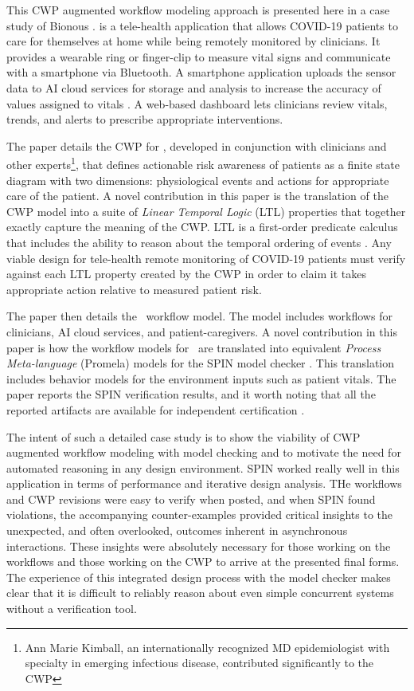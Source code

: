 This CWP augmented workflow modeling approach is presented here in a case study of Bionous \phware. \phware is a tele-health application that allows COVID-19 patients to care for themselves at home while being remotely monitored by clinicians. It provides a wearable ring or finger-clip to measure vital signs and communicate with a smartphone via Bluetooth. A smartphone application uploads the sensor data to AI cloud services for storage and analysis to increase the accuracy of values assigned to vitals \cite{Altschul2004PredictiveMI,10.2307/2984877,10.5555/1643031.1643047}. A web-based dashboard lets clinicians review vitals, trends, and alerts to prescribe appropriate interventions. 

The paper details the CWP for \phware, developed in conjunction with clinicians and other experts\footnote{Ann Marie Kimball, an internationally recognized  MD epidemiologist with specialty in emerging infectious disease, contributed significantly to the CWP}, that defines actionable risk awareness of patients as a finite state diagram with two dimensions: physiological events and actions for appropriate care of the patient. A novel contribution in this paper is the translation of the CWP model into a suite of \emph{Linear Temporal Logic} (LTL) properties that together exactly capture the meaning of the CWP. LTL is a first-order predicate calculus that includes the ability to reason about the temporal ordering of events \cite{10.5555/975331}. Any viable design for tele-health remote monitoring of COVID-19 patients must verify against each LTL property created by the CWP in order to claim it takes appropriate action relative to measured patient risk.

The paper then details the \phware\ workflow model. The model includes workflows for clinicians, AI cloud services, and patient-caregivers. A novel contribution in this paper is how the workflow models for \phware\ are translated into equivalent \emph{Process Meta-language} (Promela) models for the SPIN model checker \cite{spin}. This translation includes behavior models for the environment inputs such as patient vitals. The paper reports the SPIN verification results, and it worth noting that all the reported artifacts are available for independent certification \cite{repo}.

The intent of such a detailed case study is to show the viability of CWP augmented workflow modeling with model checking and to motivate the need for automated reasoning in any design environment. SPIN worked really well in this application in terms of performance and iterative design analysis. THe workflows and CWP revisions were easy to verify when posted, and when SPIN found violations, the accompanying counter-examples provided critical insights to the unexpected, and often overlooked, outcomes inherent in asynchronous interactions. These insights were absolutely necessary for those working on the workflows and those working on the CWP to arrive at the presented final forms. The experience of this integrated design process with the model checker makes clear that it is difficult to reliably reason about even simple concurrent systems without a verification tool.